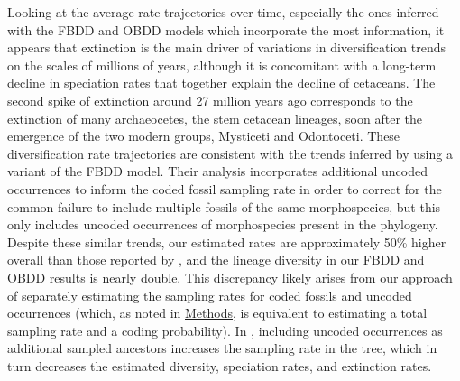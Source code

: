 \documentclass[oupdraft]{sysbio}
\newcommand{\revised}[1]{{\color{blue} #1}}
\begin{document}
Looking at the average rate trajectories over time, especially the ones inferred with the FBDD and OBDD models which incorporate the most information, it appears that extinction is the main driver of variations in diversification trends on the scales of millions of years, although it is concomitant with a long-term decline in speciation rates that together explain the decline of cetaceans. The second spike of extinction around 27 million years ago corresponds to the extinction of many archaeocetes, the stem cetacean lineages, soon after the emergence of the two modern groups, Mysticeti and Odontoceti. 
These diversification rate trajectories are consistent with the trends inferred by \citet{quintero_loss_2025} using a variant of the FBDD model. Their analysis incorporates additional \revised{uncoded} occurrences to inform the \revised{coded} fossil sampling rate in order to correct for the common failure to include multiple fossils of the same morphospecies, but this only includes \revised{uncoded} occurrences of morphospecies present in the phylogeny. Despite these similar trends, our estimated rates are approximately 50\% higher overall than those reported by \citet{quintero_loss_2025}, and the lineage diversity in our FBDD and OBDD results is nearly double. This discrepancy likely arises from our approach of \revised{separately estimating the sampling rates for \revised{coded} fossils and \revised{uncoded} occurrences (which, as noted in \hyperref[OBDD]{Methods}, is equivalent to estimating a total sampling rate and a coding probability)}. In \citet{quintero_loss_2025}, including \revised{uncoded} occurrences as additional sampled ancestors increases the sampling rate in the tree, which in turn decreases the estimated diversity, speciation rates, and extinction rates.
\end{document}
